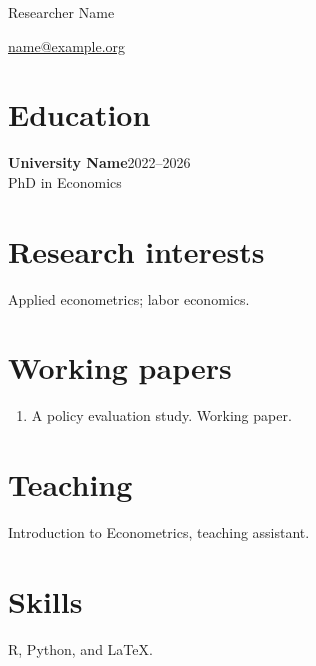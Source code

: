 \documentclass{article}
\begin{document}
\begin{center}{\LARGE Researcher Name}\par\href{mailto:name@example.org}{name@example.org}\end{center}
\section*{Education}
\textbf{University Name}\hfill 2022--2026\\PhD in Economics
\section*{Research interests}Applied econometrics; labor economics.
\section*{Working papers}\begin{enumerate}[leftmargin=*]\item A policy evaluation study. Working paper.\end{enumerate}
\section*{Teaching}Introduction to Econometrics, teaching assistant.
\section*{Skills}R, Python, and LaTeX.
\end{document}
